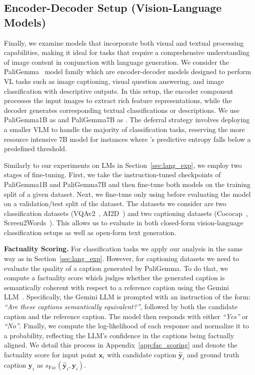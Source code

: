 \subsection{Encoder-Decoder Setup (Vision-Language Models)}
Finally, we examine models that incorporate both visual and textual processing capabilities, making it ideal for tasks that require a comprehensive understanding of image content in conjunction with language generation. We consider the PaliGemma~\citep{steiner2024paligemma} model family which are encoder-decoder models designed to perform VL tasks such as image captioning, visual question answering, and image classification with descriptive outputs. In this setup, the encoder component processes the input images to extract rich feature representations, while the decoder generates corresponding textual classifications or descriptions. We use PaliGemma1B as \smallmodel and PaliGemma7B as \bigmodel. The deferral strategy involves deploying a smaller VLM to handle the majority of classification tasks, reserving the more resource intensive 7B model for instances where \smallmodel's predictive entropy falls below a predefined threshold.

Similarly to our experiments on LMs in Section~\ref{sec:lang_exp}, we employ two stages of fine-tuning. First, we take the instruction-tuned checkpoints of PaliGemma1B and PaliGemma7B and then fine-tune both models on the training split of a given dataset. Next, we fine-tune only \smallmodel using \loss before evaluating the model on a validation/test split of the dataset. The datasets we consider are two classification datasets (VQAv2~\citep{goyal2017making}, AI2D~\citep{hiippala2021ai2d}) and two captioning datasets (Cococap~\citep{lin2014microsoft}, Screen2Words~\citep{wang2021screen2words}). This allows us to evaluate \loss in both closed-form vision-language classification setups as well as open-form text generation.

\textbf{Factuality Scoring.}
For classification tasks we apply our analysis in the same way as in Section~\ref{sec:lang_exp}. However, for captioning datasets we need to evaluate the quality of a caption generated by PaliGemma. To do that, we compute a factuality score which judges whether the generated caption is semantically coherent with respect to a reference caption using the Gemini LLM~\citep{team2023gemini}. Specifically, the Gemini LLM is prompted with an instruction of the form: \emph{``Are these captions semantically equivalent?''}, followed by both the candidate caption and the reference caption. The model then responds with either \emph{``Yes''} or \emph{``No''}. Finally, we compute the log-likelihood of each response and normalize it to a probability, reflecting the LLM's confidence in the captions being factually aligned. We detail this process in Appendix~\ref{app:fac_scoring} and denote the factuality score for input point $\mathbf{x}_i$ with candidate caption $\hat{\mathbf{y}}_i$ and ground truth caption $\mathbf{y}_i$ as $s_{\text{Fac}}(\hat{\mathbf{y}}_i, \mathbf{y}_i)$.



